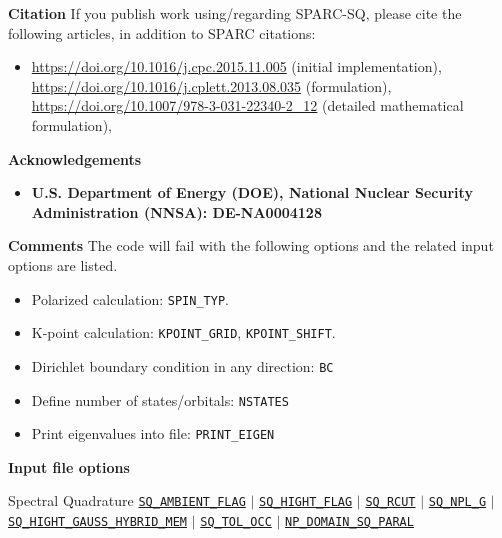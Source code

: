 \begin{frame}[allowframebreaks]{\textbf{Citation}} \label{Citation}
If you publish work using/regarding SPARC-SQ, please cite the following articles, in addition to SPARC citations:
\begin{itemize}
    \item \url{https://doi.org/10.1016/j.cpc.2015.11.005} (initial implementation),
     \url{https://doi.org/10.1016/j.cplett.2013.08.035} (formulation),
    \url{https://doi.org/10.1007/978-3-031-22340-2_12} (detailed mathematical formulation),

\end{itemize}
\end{frame}

\begin{frame}[allowframebreaks]{\textbf{Acknowledgements}} \label{Acknowledgements}
\begin{itemize}
    \item \textbf{U.S. Department of Energy (DOE), National Nuclear Security Administration (NNSA): DE-NA0004128 
        } \\
\end{itemize}
\end{frame}

\begin{frame}[allowframebreaks]{\textbf{Comments}} \label{Introduction}
The code will fail with the following options and the related input options are listed.
\begin{itemize}
  \item Polarized calculation: \texttt{SPIN\_TYP}.
  \item K-point calculation: \texttt{KPOINT\_GRID}, \texttt{KPOINT\_SHIFT}.
  \item Dirichlet boundary condition in any direction: \texttt{BC}
  \item Define number of states/orbitals: \texttt{NSTATES}
  \item Print eigenvalues into file: \texttt{PRINT\_EIGEN}
\end{itemize}

\end{frame}

\begin{frame}[allowframebreaks]{\textbf{Input file options}} \label{Index}
\vspace{-2mm}
 \begin{block}{Spectral Quadrature}
\hyperlink{SQ_AMBIENT_FLAG}{\texttt{SQ\_AMBIENT\_FLAG}} $\vert$ 
\hyperlink{SQ_HIGHT_FLAG}{\texttt{SQ\_HIGHT\_FLAG}} $\vert$ 
\hyperlink{SQ_RCUT}{\texttt{SQ\_RCUT}} $\vert$ 
\hyperlink{SQ_NPL_G}{\texttt{SQ\_NPL\_G}}  $\vert$ 
\hyperlink{SQ_GAUSS_HYBRID_MEM}{\texttt{SQ\_HIGHT\_GAUSS\_HYBRID\_MEM}} $\vert$ 
\hyperlink{SQ_TOL_OCC}{\texttt{SQ\_TOL\_OCC}} $\vert$ 
\hyperlink{NP_DOMAIN_SQ_PARAL}{\texttt{NP\_DOMAIN\_SQ\_PARAL}} 
\end{block}

\end{frame}
